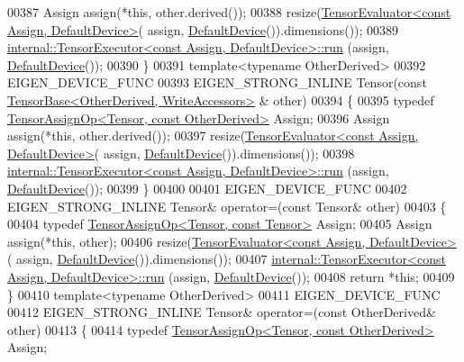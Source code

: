 \begin{DoxyCode}
00387       Assign assign(*\textcolor{keyword}{this}, other.derived());
00388       resize(\hyperlink{struct_eigen_1_1_tensor_evaluator}{TensorEvaluator<const Assign, DefaultDevice>}(
      assign, \hyperlink{struct_eigen_1_1_default_device}{DefaultDevice}()).dimensions());
00389       \hyperlink{class_eigen_1_1internal_1_1_tensor_executor}{internal::TensorExecutor<const Assign, DefaultDevice>::run}
      (assign, \hyperlink{struct_eigen_1_1_default_device}{DefaultDevice}());
00390     \}
00391     \textcolor{keyword}{template}<\textcolor{keyword}{typename} OtherDerived>
00392     EIGEN\_DEVICE\_FUNC
00393     EIGEN\_STRONG\_INLINE Tensor(\textcolor{keyword}{const} \hyperlink{class_eigen_1_1_tensor_base}{TensorBase<OtherDerived, WriteAccessors>}
      & other)
00394     \{
00395       \textcolor{keyword}{typedef} \hyperlink{class_eigen_1_1_tensor_assign_op}{TensorAssignOp<Tensor, const OtherDerived>} Assign;
00396       Assign assign(*\textcolor{keyword}{this}, other.derived());
00397       resize(\hyperlink{struct_eigen_1_1_tensor_evaluator}{TensorEvaluator<const Assign, DefaultDevice>}(
      assign, \hyperlink{struct_eigen_1_1_default_device}{DefaultDevice}()).dimensions());
00398       \hyperlink{class_eigen_1_1internal_1_1_tensor_executor}{internal::TensorExecutor<const Assign, DefaultDevice>::run}
      (assign, \hyperlink{struct_eigen_1_1_default_device}{DefaultDevice}());
00399     \}
00400 
00401     EIGEN\_DEVICE\_FUNC
00402     EIGEN\_STRONG\_INLINE Tensor& operator=(\textcolor{keyword}{const} Tensor& other)
00403     \{
00404       \textcolor{keyword}{typedef} \hyperlink{class_eigen_1_1_tensor_assign_op}{TensorAssignOp<Tensor, const Tensor>} Assign;
00405       Assign assign(*\textcolor{keyword}{this}, other);
00406       resize(\hyperlink{struct_eigen_1_1_tensor_evaluator}{TensorEvaluator<const Assign, DefaultDevice>}(
      assign, \hyperlink{struct_eigen_1_1_default_device}{DefaultDevice}()).dimensions());
00407       \hyperlink{class_eigen_1_1internal_1_1_tensor_executor}{internal::TensorExecutor<const Assign, DefaultDevice>::run}
      (assign, \hyperlink{struct_eigen_1_1_default_device}{DefaultDevice}());
00408       \textcolor{keywordflow}{return} *\textcolor{keyword}{this};
00409     \}
00410     \textcolor{keyword}{template}<\textcolor{keyword}{typename} OtherDerived>
00411     EIGEN\_DEVICE\_FUNC
00412     EIGEN\_STRONG\_INLINE Tensor& operator=(\textcolor{keyword}{const} OtherDerived& other)
00413     \{
00414       \textcolor{keyword}{typedef} \hyperlink{class_eigen_1_1_tensor_assign_op}{TensorAssignOp<Tensor, const OtherDerived>} Assign;

\end{DoxyCode}
